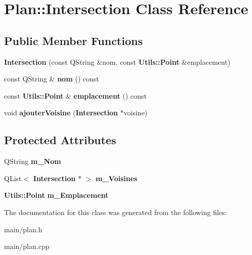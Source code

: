 \section{\-Plan\-:\-:\-Intersection \-Class \-Reference}
\label{class_plan_1_1_intersection}
\subsection*{\-Public \-Member \-Functions}
\begin{DoxyCompactItemize}
\item 
{\bfseries \-Intersection} (const \-Q\-String \&nom, const {\bf \-Utils\-::\-Point} \&emplacement)\label{class_plan_1_1_intersection_a4be86b5884ed6da039fe77da2f68740c}

\item 
const \-Q\-String \& {\bfseries nom} () const \label{class_plan_1_1_intersection_ad902d9bd660255ed642e90252ebd5f2b}

\item 
const {\bf \-Utils\-::\-Point} \& {\bfseries emplacement} () const \label{class_plan_1_1_intersection_aa58e4efd96288d4ad08f0d8703c598ab}

\item 
void {\bfseries ajouter\-Voisine} ({\bf \-Intersection} $\ast$voisine)\label{class_plan_1_1_intersection_a442395cd461c4f1320813288dc4f336e}

\end{DoxyCompactItemize}
\subsection*{\-Protected \-Attributes}
\begin{DoxyCompactItemize}
\item 
\-Q\-String {\bfseries m\-\_\-\-Nom}\label{class_plan_1_1_intersection_a686d413078152d9ced6666ba8f4b82b1}

\item 
\-Q\-List$<$ {\bf \-Intersection} $\ast$ $>$ {\bfseries m\-\_\-\-Voisines}\label{class_plan_1_1_intersection_a4d3c039a0762780092c6a4ae18a0c65b}

\item 
{\bf \-Utils\-::\-Point} {\bfseries m\-\_\-\-Emplacement}\label{class_plan_1_1_intersection_a9866e872363f53adbffbc5e55226ae9c}

\end{DoxyCompactItemize}


\-The documentation for this class was generated from the following files\-:\begin{DoxyCompactItemize}
\item 
main/plan.\-h\item 
main/plan.\-cpp\end{DoxyCompactItemize}
